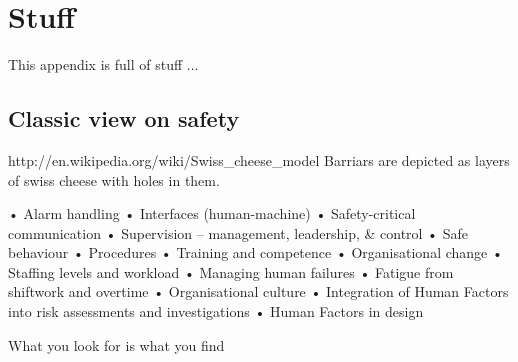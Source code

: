 \chapter{Stuff}
This appendix is full of stuff ...



\section{Classic view on safety}
http://en.wikipedia.org/wiki/Swiss_cheese_model
Barriars are depicted as layers of swiss cheese with holes in them. 




• Alarm handling
• Interfaces (human-machine)
• Safety-critical communication
• Supervision – management, leadership, & control
• Safe behaviour
• Procedures
• Training and competence
• Organisational change
• Staffing levels and workload
• Managing human failures
• Fatigue from shiftwork and overtime
• Organisational culture
• Integration of Human Factors into risk assessments and investigations
• Human Factors in design


What you look for is what you find